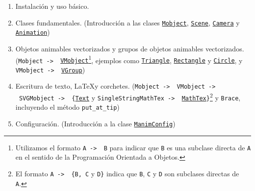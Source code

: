 \documentclass[a4paper]{article}
\begin{document}
\begin{enumerate}

    \item Instalación y uso básico.

    \item Clases fundamentales. (Introducción a las clases \href{https://docs.manim.community/en/v0.16.0.post0/reference/manim.mobject.mobject.Mobject.html}{\texttt{Mobject}}, \href{https://docs.manim.community/en/v0.16.0.post0/reference/manim.scene.scene.Scene.html}{\texttt{Scene}}, \href{https://docs.manim.community/en/v0.16.0.post0/reference/manim.camera.camera.Camera.html?highlight=Camera}{\texttt{Camera}} y \href{https://docs.manim.community/en/v0.16.0.post0/reference/manim.animation.animation.Animation.html#}{\texttt{Animation}})

    \item Objetos animables vectorizados y grupos de objetos animables vectorizados. (\texttt{Mobject -> \ \href{https://docs.manim.community/en/v0.16.0.post0/reference/manim.mobject.types.vectorized_mobject.VMobject.html?highlight=VMobject}{VMobject}}\footnote{Utilizamos el formato \texttt{A -> \ B} para indicar que \texttt{B} es una subclase directa de \texttt{A} en el sentido de la Programación Orientada a Objetos.}, ejemplos como \href{https://docs.manim.community/en/v0.16.0.post0/reference/manim.mobject.geometry.polygram.Triangle.html?highlight=Triangle}{\texttt{Triangle}}, \href{https://docs.manim.community/en/v0.16.0.post0/reference/manim.mobject.geometry.polygram.Rectangle.html?highlight=Rectangle}{\texttt{Rectangle}} y \href{https://docs.manim.community/en/v0.16.0.post0/reference/manim.mobject.geometry.arc.Circle.html?highlight=Circle}{\texttt{Circle}}, y \texttt{VMobject -> \ \href{https://docs.manim.community/en/v0.16.0/reference/manim.mobject.types.vectorized_mobject.VGroup.html?highlight=VGroup}{VGroup}})

    \item Escritura de texto, \LaTeX y corchetes. (\texttt{Mobject -> \ VMobject -> \ SVGMobject -> \ \{\href{https://docs.manim.community/en/v0.16.0.post0/reference/manim.mobject.text.text_mobject.Text.html?highlight=Text}{Text}} y \texttt{SingleStringMathTex -> \ \href{https://docs.manim.community/en/v0.16.0.post0/reference/manim.mobject.text.tex_mobject.MathTex.html?highlight=MathTex}{MathTex}\}}\footnote{El formato \texttt{A -> \ \{B, C} y \texttt{D\}} indica que \texttt{B}, \texttt{C} y \texttt{D} son subclases directas de \texttt{A}.} y \texttt{Brace}, incluyendo el método \texttt{put\_at\_tip})

    \item Configuración. (Introducción a la clase \href{https://docs.manim.community/en/v0.16.0.post0/reference/manim._config.utils.ManimConfig.html?highlight=ManimConfig}{\texttt{ManimConfig}})
\end{enumerate}
\end{document}
